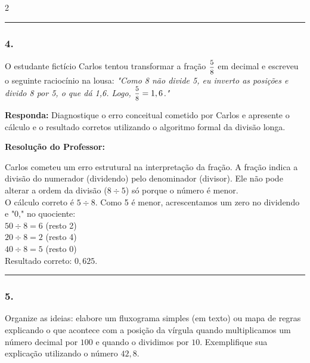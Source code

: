 \begin{multicols*}{2}
\par\vspace{\espacoQuestao}

\noindent\textcolor{CorLinha}{\rule{\linewidth}{0.5pt}} 
\par\vspace{\espacoPreQuestao}
\subsubsection*{4.} O estudante fictício Carlos tentou transformar a fração $ \mfrac{5}{8} $ em decimal e escreveu o seguinte raciocínio na lousa: 
\textit{"Como 8 não divide 5, eu inverto as posições e divido 8 por 5, o que dá 1,6. Logo, $ \mfrac{5}{8} = 1,6 $."}
\begin{boxresponda}
\textbf{Responda:} Diagnostique o erro conceitual cometido por Carlos e apresente o cálculo e o resultado corretos utilizando o algoritmo formal da divisão longa.
\end{boxresponda}

\ifgabarito
    \begin{tcolorbox}[colback=CorTitUm!5, colframe=CorTitUm, boxrule=1pt, arc=4pt, left=6pt, right=6pt, top=6pt, bottom=6pt]
    \small\textbf{\textcolor{CorTitUm}{Resolução do Professor:}}\par\vspace{0.1cm}
    \color{CinzaEscuro}
    Carlos cometeu um erro estrutural na interpretação da fração. A fração indica a divisão do numerador (dividendo) pelo denominador (divisor). Ele não pode alterar a ordem da divisão ($ 8 \div 5 $) só porque o número é menor.\\
    O cálculo correto é $ 5 \div 8 $. Como 5 é menor, acrescentamos um zero no dividendo e "0," no quociente:\\
    $ 50 \div 8 = 6 $ (resto 2)\\
    $ 20 \div 8 = 2 $ (resto 4)\\
    $ 40 \div 8 = 5 $ (resto 0)\\
    Resultado correto: $ 0,625 $.
    \end{tcolorbox}
\fi

\par\vspace{\espacoQuestao}

\noindent\textcolor{CorLinha}{\rule{\linewidth}{0.5pt}} 
\par\vspace{\espacoPreQuestao}
\subsubsection*{5.} Organize as ideias: elabore um fluxograma simples (em texto) ou mapa de regras explicando o que acontece com a posição da vírgula quando multiplicamos um número decimal por $ 100 $ e quando o dividimos por $ 10 $. Exemplifique sua explicação utilizando o número $ 42,8 $.


\end{multicols*}
